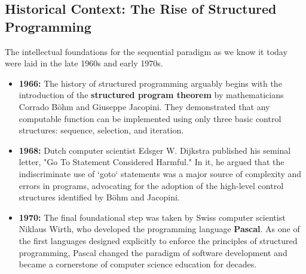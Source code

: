 \subsection{Historical Context: The Rise of Structured Programming}
The intellectual foundations for the sequential paradigm as we know it today were laid in the late 1960s and early 1970s.
\begin{itemize}
    \item \textbf{1966:} The history of structured programming arguably begins with the introduction of the \textbf{structured program theorem} by mathematicians Corrado Böhm and Giuseppe Jacopini. They demonstrated that any computable function can be implemented using only three basic control structures: sequence, selection, and iteration.
    \item \textbf{1968:} Dutch computer scientist Edsger W. Dijkstra published his seminal letter, "Go To Statement Considered Harmful." In it, he argued that the indiscriminate use of `goto` statements was a major source of complexity and errors in programs, advocating for the adoption of the high-level control structures identified by Böhm and Jacopini.
    \item \textbf{1970:} The final foundational step was taken by Swiss computer scientist Niklaus Wirth, who developed the programming language \textbf{Pascal}. As one of the first languages designed explicitly to enforce the principles of structured programming, Pascal changed the paradigm of software development and became a cornerstone of computer science education for decades.
\end{itemize}

